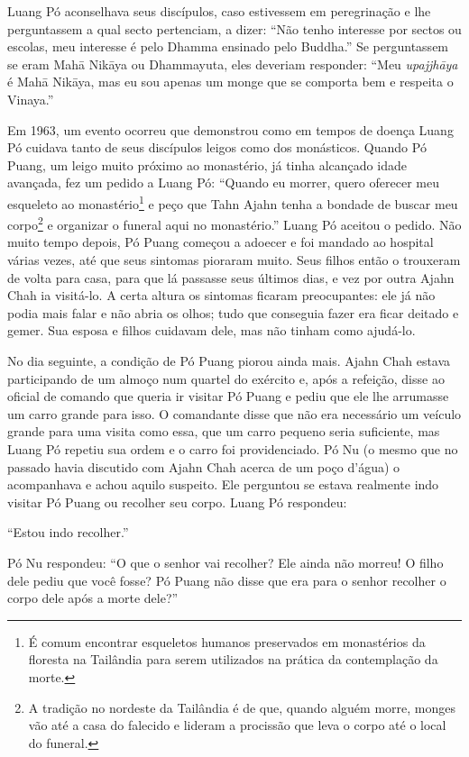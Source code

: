 Luang Pó aconselhava seus discípulos, caso estivessem em peregrinação e
lhe perguntassem a qual secto pertenciam, a dizer: ``Não tenho interesse
por sectos ou escolas, meu interesse é pelo Dhamma ensinado pelo
Buddha.'' Se perguntassem se eram Mahā Nikāya ou Dhammayuta, eles
deveriam responder: ``Meu \emph{upajjhāya} é Mahā Nikāya, mas eu sou
apenas um monge que se comporta bem e respeita o Vinaya.''

Em 1963, um evento ocorreu que demonstrou como em tempos de doença Luang
Pó cuidava tanto de seus discípulos leigos como dos monásticos. Quando
Pó Puang, um leigo muito próximo ao monastério, já tinha alcançado idade
avançada, fez um pedido a Luang Pó: ``Quando eu morrer, quero oferecer
meu esqueleto ao monastério\footnote{É comum encontrar esqueletos
  humanos preservados em monastérios da floresta na Tailândia para serem
  utilizados na prática da contemplação da morte.} e peço que Tahn Ajahn
tenha a bondade de buscar meu corpo\footnote{A tradição no nordeste da
  Tailândia é de que, quando alguém morre, monges vão até a casa do
  falecido e lideram a procissão que leva o corpo até o local do
  funeral.} e organizar o funeral aqui no monastério.'' Luang Pó aceitou
o pedido. Não muito tempo depois, Pó Puang começou a adoecer e foi
mandado ao hospital várias vezes, até que seus sintomas pioraram muito.
Seus filhos então o trouxeram de volta para casa, para que lá passasse
seus últimos dias, e vez por outra Ajahn Chah ia visitá-lo. A certa
altura os sintomas ficaram preocupantes: ele já não podia mais falar e
não abria os olhos; tudo que conseguia fazer era ficar deitado e gemer.
Sua esposa e filhos cuidavam dele, mas não tinham como ajudá-lo.

No dia seguinte, a condição de Pó Puang piorou ainda mais. Ajahn Chah
estava participando de um almoço num quartel do exército e, após a
refeição, disse ao oficial de comando que queria ir visitar Pó Puang e
pediu que ele lhe arrumasse um carro grande para isso. O comandante
disse que não era necessário um veículo grande para uma visita como
essa, que um carro pequeno seria suficiente, mas Luang Pó repetiu sua
ordem e o carro foi providenciado. Pó Nu (o mesmo que no passado havia
discutido com Ajahn Chah acerca de um poço d'água) o acompanhava e
achou aquilo suspeito. Ele perguntou se estava realmente indo visitar Pó
Puang ou recolher seu corpo. Luang Pó respondeu:

``Estou indo recolher.''

Pó Nu respondeu: ``O que o senhor vai recolher? Ele ainda não morreu! O
filho dele pediu que você fosse? Pó Puang não disse que era para o
senhor recolher o corpo dele após a morte dele?''


